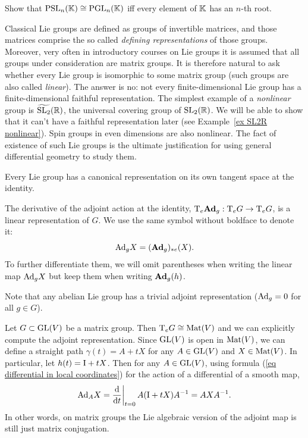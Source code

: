 \begin{xca}\label{xca psl=pgl}
    Show that $\operatorname{PSL}_n(\mathbb{K})\cong \operatorname{PGL}_n(\mathbb{K})$ iff every element of $\mathbb{K}$ has an $n$-th root.
\end{xca}

\begin{rem}
    Classical Lie groups are defined as groups of invertible matrices, and those matrices comprise the so called \emph{defining representations} of those groups. Moreover, very often in introductory courses on Lie groups it is assumed that all groups under consideration are matrix groups. It is therefore natural to ask whether every Lie group is isomorphic to some matrix group (such groups are also called \emph{linear}). The answer is no: not every finite-dimensional Lie group has a finite-dimensional faithful representation. The simplest example of a \emph{nonlinear} group is $\widetilde{\operatorname{SL}_2}(\mathbb{R})$, the universal covering group of $\operatorname{SL}_2(\mathbb{R})$.  We will be able to show that it can't have a faithful representation later (see Example~\ref{ex SL2R nonlinear}). Spin groups in even dimensions are also nonlinear. The fact of existence of such Lie groups is the ultimate justification for using general differential geometry to study them.
\end{rem}

Every Lie group has a canonical representation on its own tangent space at the identity.

\begin{defn}
    The derivative of the adjoint action at the identity, $\mathrm{T}_e\mathrm{\mathbf{Ad}}_g:\mathrm{T}_e G\to \mathrm{T}_e G$, is a linear representation of $G$. We use the same symbol without boldface to denote it:
    \[\mathrm{Ad}_g X=(\mathrm{\mathbf{Ad}}_g)_{\ast e}(X).\]
    To further differentiate them, we will omit parentheses when writing the linear map $\mathrm{Ad}_g X$ but keep them when writing $\mathrm{\mathbf{Ad}}_g(h)$.
\end{defn}

    Note that any abelian Lie group has a trivial adjoint representation ($\mathrm{Ad}_g=0$ for all $g\in G$).

\begin{example}
    Let $G\subset \operatorname{GL}(V)$ be a matrix group. Then $\mathrm{T}_e G\cong \operatorname{Mat}(V)$ and we can explicitly compute the adjoint representation. Since $\operatorname{GL}(V)$ is open in $\operatorname{Mat}(V)$, we can define a straight path $\gamma(t)=A+tX$ for any $A\in \operatorname{GL}(V)$ and $X\in \operatorname{Mat}(V)$. In particular, let $h(t)=\mathrm{I}+tX$. Then for any $A\in \operatorname{GL}(V)$, using formula (\ref{eq differential in local coordinates}) for the action of a differential of a smooth map,
    \[\Ad_A X=\restr{\frac{\dd}{\dd t}}{t=0}A(\rmI+tX)A^{-1}=AXA^{-1}.\]
    In other words, on matrix groups the Lie algebraic version of the adjoint map is still just matrix conjugation.
\end{example}






